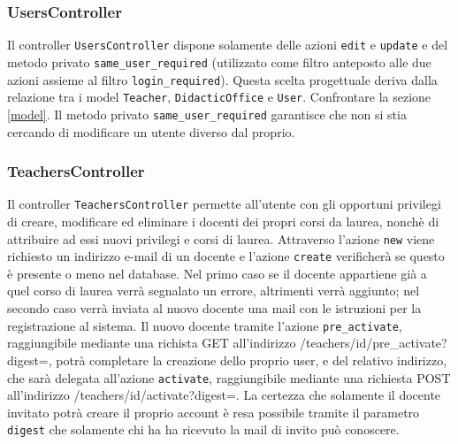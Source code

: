 \documentclass[11pt,a4paper]{article}
\begin{document}
\subsubsection{UsersController}
Il controller \verb|UsersController| dispone solamente delle azioni \verb|edit| e \verb|update| e del metodo privato \verb|same_user_required| (utilizzato come filtro anteposto alle due azioni assieme al filtro \verb|login_required|). Questa scelta progettuale deriva dalla relazione tra i model \verb|Teacher|, \verb|DidacticOffice| e \verb|User|. Confrontare la sezione \ref{model}.
Il metodo privato \verb|same_user_required| garantisce che non si stia cercando di modificare un utente diverso dal proprio.
\subsubsection{TeachersController}
Il controller \verb|TeachersController| permette all'utente con gli opportuni privilegi di creare, modificare ed eliminare i docenti dei propri corsi da laurea, nonchè di attribuire ad essi nuovi privilegi e corsi di laurea. Attraverso l'azione \verb|new| viene richiesto un indirizzo e-mail di un docente e l'azione \verb|create| verificherà se questo è presente o meno nel database. Nel primo caso se il docente appartiene già a quel corso di laurea verrà segnalato un errore, altrimenti verrà aggiunto; nel secondo caso verrà inviata al nuovo docente una mail con le istruzioni per la registrazione al sistema. Il nuovo docente tramite l'azione \verb|pre_activate|, raggiungibile mediante una richista GET all'indirizzo /teachers/id/pre\_activate?digest=, potrà completare la creazione dello proprio user, e del relativo indirizzo, che sarà delegata all'azione \verb|activate|, raggiungibile mediante una richiesta POST all'indirizzo /teachers/id/activate?digest=. La certezza che solamente il docente invitato potrà creare il proprio account è resa possibile tramite il parametro \verb|digest| che solamente chi ha ha ricevuto la mail di invito può conoscere.
\end{document}
